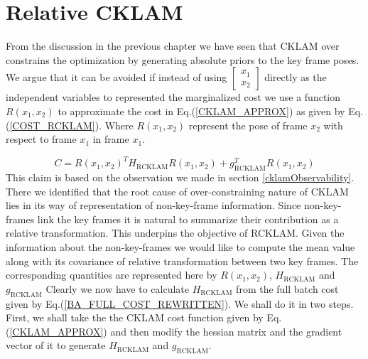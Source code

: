\chapter{Relative CKLAM}
\label{sec:RCKLAM}

From the discussion in the previous chapter we have seen that CKLAM over constrains the optimization by generating absolute priors to the key frame poses. We argue that it can be avoided if instead of using $\begin{bmatrix} x_{1} \\ x_{2} \end{bmatrix}$ directly as the independent variables to represented the marginalized cost we use a function $R(x_1, x_2)$ to approximate the cost in Eq.(\ref{CKLAM_APPROX}) as given by Eq.(\ref{COST_RCKLAM}). Where $R(x_1, x_2)$ represent the pose of frame $x_2$ with respect to frame $x_1$ in frame $x_1$. 

\begin{equation}
	C = R(x_1, x_2)^TH_\mathrm{RCKLAM}R(x_1, x_2) + g_\mathrm{RCKLAM}^TR(x_1, x_2)
	\label{COST_RCKLAM}
\end{equation}
This claim is based on the observation we made in section \ref{cklamObservability}. There we identified that the root cause of over-constraining nature of CKLAM lies in its way of representation of non-key-frame information. Since non-key-frames link the key frames it is natural to summarize their contribution as a relative transformation. This underpins the objective of RCKLAM. Given the information about the non-key-frames we would like to compute the mean value along with its covariance of relative transformation between two key frames. The corresponding quantities are represented here by $R(x_1, x_2)$, $H_\mathrm{RCKLAM}$ and $g_\mathrm{RCKLAM}$
Clearly we now have to calculate $H_\mathrm{RCKLAM}$ from the full batch cost given by Eq.(\ref{BA_FULL_COST_REWRITTEN}). We shall do it in two steps. First, we shall take the the CKLAM cost function given by Eq.(\ref{CKLAM_APPROX}) and then modify the hessian matrix and the gradient vector of it to generate $H_\mathrm{RCKLAM}$ and $g_\mathrm{RCKLAM}$.

